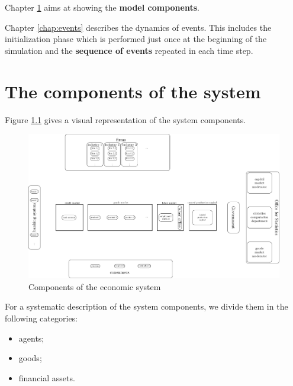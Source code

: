\documentclass{book}
\begin{document}

Chapter \ref{chap:components} aims at showing the \textbf{model components}.


Chapter \ref{chap:events} describes the dynamics of events. This includes the initialization phase which is performed just once at the beginning of the simulation and the \textbf{sequence of events} repeated in each time step.





\newpage

\chapter{The components of the system}\label{chap:components}

Figure \ref{fig:components} gives a visual representation of the system components.

\begin{figure}[htp]
\hskip-1cm\includegraphics[scale=0.5]{agents_and_interactions_figure1-0.pdf}
	\caption{Components of the economic system}
	\label{fig:components}
\end{figure}
For a systematic description of the system components, we divide them in the following categories:
\begin{itemize}
	\item agents;
	\item goods;
	\item financial assets.
\end{itemize}
\end{document}
